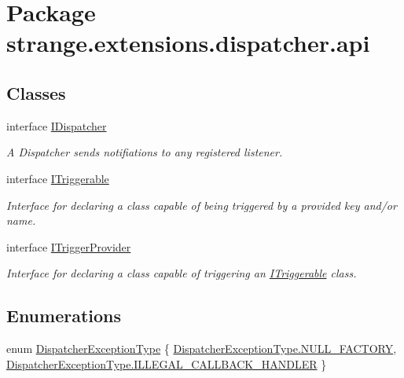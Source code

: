 \hypertarget{namespacestrange_1_1extensions_1_1dispatcher_1_1api}{\section{Package strange.\-extensions.\-dispatcher.\-api}
\label{namespacestrange_1_1extensions_1_1dispatcher_1_1api}
}
\subsection*{Classes}
\begin{DoxyCompactItemize}
\item 
interface \hyperlink{interfacestrange_1_1extensions_1_1dispatcher_1_1api_1_1_i_dispatcher}{I\-Dispatcher}
\begin{DoxyCompactList}\small\item\em A Dispatcher sends notifiations to any registered listener. \end{DoxyCompactList}\item 
interface \hyperlink{interfacestrange_1_1extensions_1_1dispatcher_1_1api_1_1_i_triggerable}{I\-Triggerable}
\begin{DoxyCompactList}\small\item\em Interface for declaring a class capable of being triggered by a provided key and/or name. \end{DoxyCompactList}\item 
interface \hyperlink{interfacestrange_1_1extensions_1_1dispatcher_1_1api_1_1_i_trigger_provider}{I\-Trigger\-Provider}
\begin{DoxyCompactList}\small\item\em Interface for declaring a class capable of triggering an \hyperlink{interfacestrange_1_1extensions_1_1dispatcher_1_1api_1_1_i_triggerable}{I\-Triggerable} class. \end{DoxyCompactList}\end{DoxyCompactItemize}
\subsection*{Enumerations}
\begin{DoxyCompactItemize}
\item 
enum \hyperlink{namespacestrange_1_1extensions_1_1dispatcher_1_1api_a03ba459ad62cc042c88405d9419eb4c6}{Dispatcher\-Exception\-Type} \{ \hyperlink{namespacestrange_1_1extensions_1_1dispatcher_1_1api_a03ba459ad62cc042c88405d9419eb4c6affe448cb7684bf31fe964e1b2db4a28b}{Dispatcher\-Exception\-Type.\-N\-U\-L\-L\-\_\-\-F\-A\-C\-T\-O\-R\-Y}, 
\hyperlink{namespacestrange_1_1extensions_1_1dispatcher_1_1api_a03ba459ad62cc042c88405d9419eb4c6a471aab618a9cfb7e8612ebaa9977ddc9}{Dispatcher\-Exception\-Type.\-I\-L\-L\-E\-G\-A\-L\-\_\-\-C\-A\-L\-L\-B\-A\-C\-K\-\_\-\-H\-A\-N\-D\-L\-E\-R}
 \}
\end{DoxyCompactItemize}


